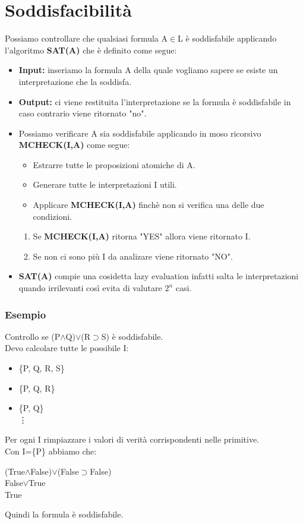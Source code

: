 \documentclass[../main.tex]{subfiles}
\begin{document}
    \section{Soddisfacibilità}
    Possiamo controllare che qualsiasi formula A$\in$L è soddisfabile applicando l'algoritmo \textbf{SAT(A)} che è definito come segue:
    \begin{itemize}
        \item \textbf{Input:} inseriamo la formula A della quale vogliamo sapere se esiste un interpretazione che la soddisfa.
        \item \textbf{Output:} ci viene restituita l'interpretazione se la formula è soddisfabile in caso contrario viene ritornato "no".
        \item Possiamo verificare A sia soddisfabile applicando in moso ricorsivo \textbf{MCHECK(I,A)} come segue:
        \begin{itemize}
            \item Estrarre tutte le proposizioni atomiche di A.
            \item Generare tutte le interpretazioni I utili.
            \item Applicare \textbf{MCHECK(I,A)} finchè non si verifica una delle due condizioni.
        \end{itemize}
        \begin{enumerate}
            \item Se \textbf{MCHECK(I,A)} ritorna "YES" allora viene ritornato I.
            \item Se non ci sono più I da analizare viene ritornato "NO".
        \end{enumerate}
        \item \textbf{SAT(A)} compie una cosidetta lazy evaluation infatti salta le interpretazioni quando irrilevanti così evita di valutare $2^n$ casi.
    \end{itemize}

    \subsubsection{Esempio}
    Controllo se (P$\land$Q)$\lor$(R$\supset$S) è soddisfabile.\\
    Devo calcolare tutte le possibile I:
    \begin{itemize}
        \item \{P, Q, R, S\}
        \item \{P, Q, R\}
        \item \{P, Q\}\\
        \vdots
    \end{itemize}
    Per ogni I rimpiazzare i valori di verità corrispondenti nelle primitive.\\
    Con I=\{P\} abbiamo che:
    \begin{center}
        (True$\land$False)$\lor$(False$\supset$False)\\
        False$\lor$True\\
        True
    \end{center}
    Quindi la formula è soddisfabile.
\end{document}
